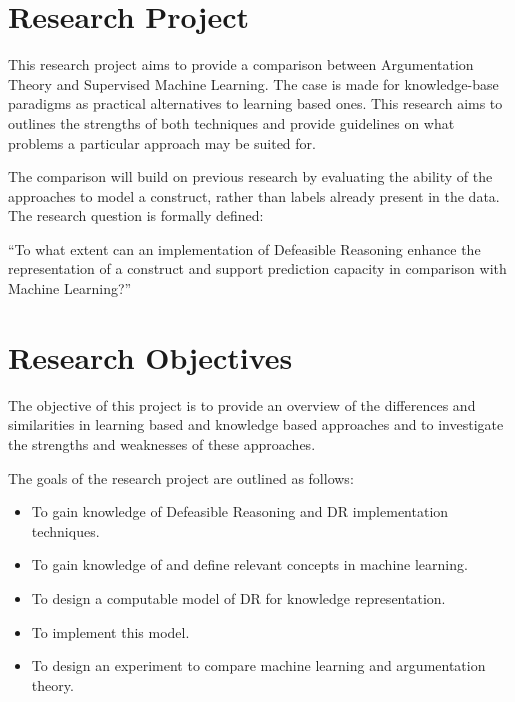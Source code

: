 \section{Research Project}


This research project aims to provide a comparison between Argumentation Theory and Supervised Machine Learning. The case is made for knowledge-base paradigms as practical alternatives to learning based ones. This research aims to outlines the strengths of both techniques and provide guidelines on what problems a particular approach may be suited for. 

The comparison will build on previous research by evaluating the ability of the approaches to model a construct, rather than labels already present in the data. The research question is formally defined:

``To what extent can an implementation of Defeasible Reasoning enhance the representation of a construct and support prediction capacity in comparison with Machine Learning?''



\section{Research Objectives}

The objective of this project is to provide an overview of the differences and similarities in learning based and knowledge based approaches and to investigate the strengths and weaknesses of these approaches. 

The goals of the research project are outlined as follows:

\begin{itemize}

  \item To gain knowledge of Defeasible Reasoning and DR implementation techniques.
  \item To gain knowledge of and define relevant concepts in machine learning.
  \item To design a computable model of DR for knowledge representation.
  \item To implement this model.
  \item To design an experiment to compare machine learning and argumentation theory.
  
\end{itemize}


